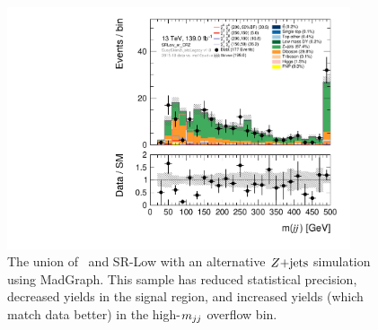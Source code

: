 \begin{figure}[tp]
\centering
\includegraphics[width=0.9\textwidth]{figures/2ljets_low_mjj_SRLow_or_CRZ_mg5.pdf}
\caption[
The union of CR-Z and SR-Low with an alternative $\zjets$ simulation using
MadGraph
]{%
The union of \crz\ and SR-Low with an alternative $\zjets$ simulation using
MadGraph.
This sample has reduced statistical precision, decreased yields in the signal
region, and increased yields (which match data better) in the high-$m_{jj}$
overflow bin.
}
\label{fig:2ljets_low_sr_or_cr_region_alt}
\end{figure}

